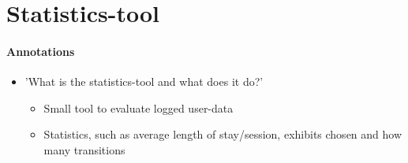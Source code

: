 \section{Statistics-tool}
\label{implementation_tool}

\paragraph{Annotations}

\begin{itemize}
	\item 'What is the statistics-tool and what does it do?'
	\begin{itemize}
		\item Small tool to evaluate logged user-data
		\item Statistics, such as average length of stay/session, exhibits chosen and how many transitions 
	\end{itemize}
\end{itemize}
